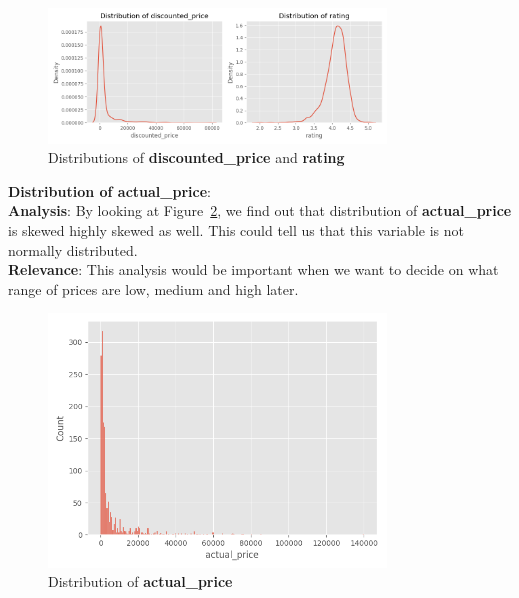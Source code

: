 \documentclass[a4paper,12pt]{article}
\begin{document}
\begin{figure}[H]
    \centering
    \includegraphics[width=0.8\textwidth]{./images/distro_of_discount_price_and_rating.png} %
    \caption{Distributions of \textbf{discounted\_price} and \textbf{rating}}
    \label{fig:Figure_1}
\end{figure}

\noindent\textbf{Distribution of actual\_price}: \\

\noindent\textbf{Analysis}: By looking at Figure~\ref{fig:Figure_2}, we find out that distribution of \textbf{actual\_price} is skewed highly skewed as well. This could tell us that this variable is not normally distributed. \\

\noindent\textbf{Relevance}: This analysis would be important when we want to decide on what range of prices are low, medium and high later. \\ 

\begin{figure}[H]
    \centering
    \includegraphics[width=0.8\textwidth]{./images/distro_of_actual_price.png} %
    \caption{Distribution of \textbf{actual\_price}}
    \label{fig:Figure_2}
\end{figure}
\end{document}
